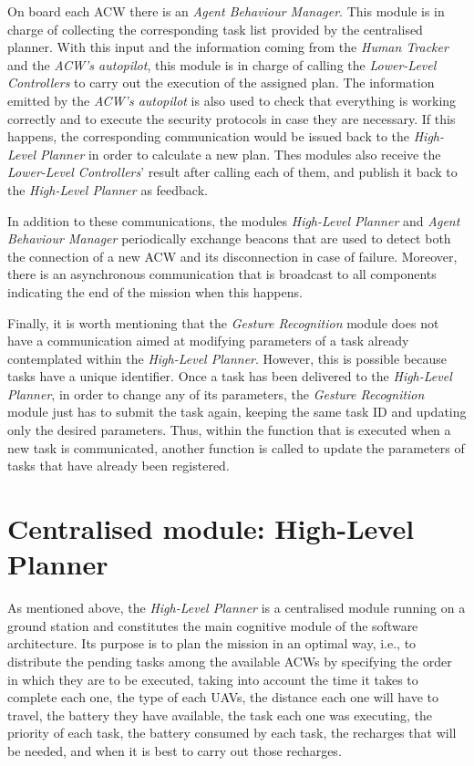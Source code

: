 On board each \gls{ACW} there is an \emph{Agent Behaviour Manager}. This module is in charge of collecting the corresponding task list provided by the centralised planner. With this input and the information coming from the \emph{Human Tracker} and the \emph{\gls{ACW}'s autopilot}, this module is in charge of calling the \emph{Lower-Level Controllers} to carry out the execution of the assigned plan. The information emitted by the \emph{\gls{ACW}'s autopilot} is also used to check that everything is working correctly and to execute the security protocols in case they are necessary. If this happens, the corresponding communication would be issued back to the \emph{High-Level Planner} in order to calculate a new plan. Thes modules also receive the \emph{Lower-Level Controllers}' result after calling each of them, and publish it back to the \emph{High-Level Planner} as feedback.

In addition to these communications, the modules \emph{High-Level Planner} and \emph{Agent Behaviour Manager} periodically exchange beacons that are used to detect both the connection of a new \gls{ACW} and its disconnection in case of failure. Moreover, there is an asynchronous communication that is broadcast to all components indicating the end of the mission when this happens.

Finally, it is worth mentioning that the \emph{Gesture Recognition} module does not have a communication aimed at modifying parameters of a task already contemplated within the \emph{High-Level Planner}. However, this is possible because tasks have a unique identifier. Once a task has been delivered to the \emph{High-Level Planner}, in order to change any of its parameters, the \emph{Gesture Recognition} module just has to submit the task again, keeping the same task \gls{ID} and updating only the desired parameters. 
Thus, within the function that is executed when a new task is communicated, another function is called to update the parameters of tasks that have already been registered.

\section{Centralised module: High-Level Planner}
\label{sec:Centralised module:TaskPlanner}
As mentioned above, the \emph{High-Level Planner} is a centralised module running on a ground station and constitutes the main cognitive module of the software architecture. Its purpose is to plan the mission in an optimal way, i.e., to distribute the pending tasks among the available \glspl{ACW} by specifying the order in which they are to be executed, taking into account the time it takes to complete each one, the type of each \glspl{UAV}, the distance each one will have to travel, the battery they have available, the task each one was executing, the priority of each task, the battery consumed by each task, the recharges that will be needed, and when it is best to carry out those recharges.

